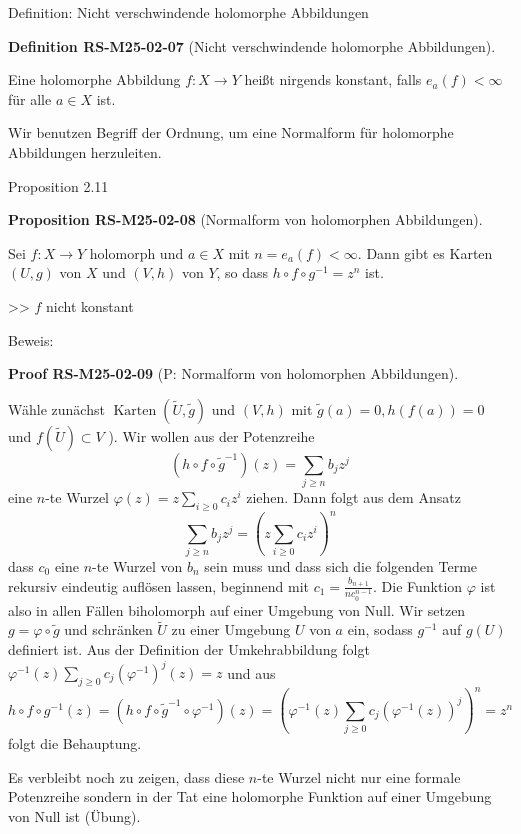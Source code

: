 \documentclass[10pt, letterpaper]{article}
\newcommand{\CustomHeading}[3]{%
  \par\medskip\noindent%
  \textbf{#1 #2} \textnormal{(#3)}.\enskip%
}
\newenvironment{DEF}[2]{\begin{unitbox}\CustomHeading{Definition}{#1}{#2}}{\end{unitbox}}
\newenvironment{PROP}[2]{\begin{unitbox}\CustomHeading{Proposition}{#1}{#2}}{\end{unitbox}}
\newenvironment{PROOF}[2]{\begin{unitbox}\CustomHeading{Proof}{#1}{#2}}{\end{unitbox}}
\begin{document}
Definition: Nicht verschwindende holomorphe Abbildungen

\begin{DEF}{RS-M25-02-07}{Nicht verschwindende holomorphe Abbildungen}
Eine holomorphe Abbildung $f: X \longrightarrow Y$ heißt nirgends konstant, falls $e_{a}(f)<\infty$ für alle $a \in X$ ist.
\end{DEF}



Wir benutzen Begriff der Ordnung, um eine Normalform für holomorphe Abbildungen herzuleiten.



Proposition 2.11 

\begin{PROP}{RS-M25-02-08}{Normalform von holomorphen Abbildungen}
Sei $f: X \rightarrow Y$ holomorph und $a \in X$ mit $n=e_{a}(f)<\infty$. Dann gibt es Karten $(U, g)$ von $X$ und $(V, h)$ von $Y$, so dass $h \circ f \circ g^{-1}=z^{n}$ ist.
\end{PROP}

>> $f$ nicht konstant


Beweis: 


\begin{PROOF}{RS-M25-02-09}{P: Normalform von holomorphen Abbildungen}
Wähle zunächst $\operatorname{Karten}(\widetilde{U}, \widetilde{g})$ und $(V, h)$ mit $\widetilde{g}(a)=0, h(f(a))=0$ und $f(\widetilde{U}) \subset V$ ). Wir wollen aus der Potenzreihe
$$
\left(h \circ f \circ \widetilde{g}^{-1}\right)(z)=\sum_{j \geq n} b_{j} z^{j}
$$
eine $n$-te Wurzel $\varphi(z)=z \sum_{i \geq 0} c_{i} z^{i}$ ziehen. Dann folgt aus dem Ansatz
$$
\sum_{j \geq n} b_{j} z^{j}=\left(z \sum_{i \geq 0} c_{i} z^{i}\right)^{n}
$$
dass $c_{0}$ eine $n$-te Wurzel von $b_{n}$ sein muss und dass sich die folgenden Terme rekursiv eindeutig auflösen lassen, beginnend mit $c_{1}=\frac{b_{n+1}}{n c_{0}^{n-1}}$. Die Funktion $\varphi$ ist also in allen Fällen biholomorph auf einer Umgebung von Null. Wir setzen $g=\varphi \circ \widetilde{g}$ und schränken $\widetilde{U}$ zu einer Umgebung $U$ von $a$ ein, sodass $g^{-1}$ auf $g(U)$ definiert ist. Aus der Definition der Umkehrabbildung folgt $\varphi^{-1}(z) \sum_{j \geq 0} c_{j}\left(\varphi^{-1}\right)^{j}(z)=z$ und aus
$$
h \circ f \circ g^{-1}(z)=\left(h \circ f \circ \widetilde{g}^{-1} \circ \varphi^{-1}\right)(z)=\left(\varphi^{-1}(z) \sum_{j \geq 0} c_{j}\left(\varphi^{-1}(z)\right)^{j}\right)^{n}=z^{n}
$$
folgt die Behauptung.

Es verbleibt noch zu zeigen, dass diese $n$-te Wurzel nicht nur eine formale Potenzreihe sondern in der Tat eine holomorphe Funktion auf einer Umgebung von Null ist (Übung).
\end{PROOF}
\end{document}
